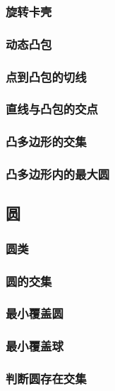\documentclass[a4paper]{article}
\begin{document}
\subsubsection{旋转卡壳}

\subsubsection{动态凸包}

\subsubsection{点到凸包的切线}

\subsubsection{直线与凸包的交点}

\subsubsection{凸多边形的交集}

\subsubsection{凸多边形内的最大圆}

\subsection{圆}

\subsubsection{圆类}

\subsubsection{圆的交集}

\subsubsection{最小覆盖圆}

\subsubsection{最小覆盖球}

\subsubsection{判断圆存在交集}
\end{document}
